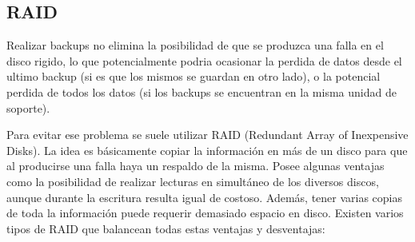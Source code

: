 \documentclass{article}
\begin{document}
\subsection{RAID}

Realizar backups no elimina la posibilidad de que se produzca una falla en el disco rigido, lo que potencialmente podria ocasionar la perdida de datos desde el ultimo backup (si es que los mismos se guardan en otro lado), o la potencial perdida de todos los datos (si los backups se encuentran en la misma unidad de soporte).

Para evitar ese problema se suele utilizar RAID (Redundant Array of Inexpensive Disks). La idea es b\'asicamente copiar la informaci\'on en m\'as de un disco para que al producirse una falla haya un respaldo de la misma. Posee algunas ventajas como la posibilidad de realizar lecturas en simult\'aneo de los diversos discos, aunque durante la escritura resulta igual de costoso. Adem\'as, tener varias copias de toda la informaci\'on puede requerir demasiado espacio en disco. Existen varios tipos de RAID que balancean todas estas ventajas y desventajas:
\end{document}
